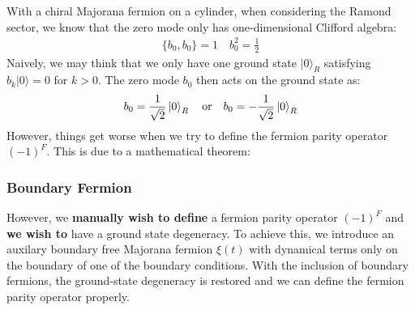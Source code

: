 With a chiral Majorana fermion on a cylinder, when considering the Ramond sector, we know that the zero mode only has one-dimensional Clifford algebra:
\begin{align}
  \{ b_0, b_0 \} = 1 \quad  b_0^2 = \frac{1}{2}
\end{align}
Naively, we may think that we only have one ground state $ |0\rangle_R $ satisfying $ b_k |0\rangle = 0 $ for $ k>0 $. The zero mode $ b_0 $ then acts on the ground state as:
\begin{align}
  b_0 = \displaystyle\frac{1}{\sqrt{2}} \ket{0}_R \quad \text{or}\quad b_0 = -\displaystyle\frac{1}{\sqrt{2}} \ket{0}_R
\end{align}
However, things get worse when we try to define the fermion parity operator $ (-1)^F $. This is due to a mathematical theorem:

\subsubsection{Boundary Fermion}

However, we \textbf{manually wish to define} a fermion parity operator $ (-1)^F $ and \textbf{we wish to} have a ground state degeneracy. To achieve this, we introduce an auxilary boundary free Majorana fermion $ \xi(t) $ with dynamical terms only on the boundary of one of the boundary conditions.
With the inclusion of boundary fermions, the ground-state degeneracy is restored and we can define the fermion parity operator properly.

